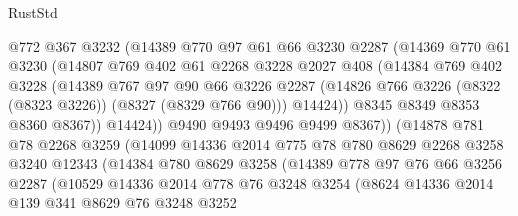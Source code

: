 \begin{lexlean}{RustStd}
\begin{coremodule}
                    @772
                    @367
                    @3232
                    (@14389
                      @770
                      @97
                      @61
                      @66
                      @3230
                      @2287
                      (@14369
                        @770
                        @61
                        @3230
                        (@14807
                          @769
                          @402
                          @61
                          @2268
                          @3228
                          @2027
                          @408
                          (@14384
                            @769
                            @402
                            @3228
                            (@14389
                              @767
                              @97
                              @90
                              @66
                              @3226
                              @2287
                              (@14826 @766 @3226 (@8322 (@8323 @3226)) (@8327 (@8329 @766 @90)))
                              @14424))
                          @8345
                          @8349
                          @8353
                          @8360
                          @8367))
                      @14424))
                  @9490
                  @9493
                  @9496
                  @9499
                  @8367))
              (@14878
                @781
                @78
                @2268
                @3259
                (@14099
                  @14336
                  @2014
                  @775
                  @78
                  @780
                  @8629
                  @2268
                  @3258
                  @3240
                  @12343
                  (@14384
                    @780
                    @8629
                    @3258
                    (@14389
                      @778
                      @97
                      @76
                      @66
                      @3256
                      @2287
                      (@10529
                        @14336
                        @2014
                        @778
                        @76
                        @3248
                        @3254
                        (@8624
                          @14336
                          @2014
                          @139
                          @341
                          @8629
                          @76
                          @3248
                          @3252

\end{coremodule}
\end{lexlean}
